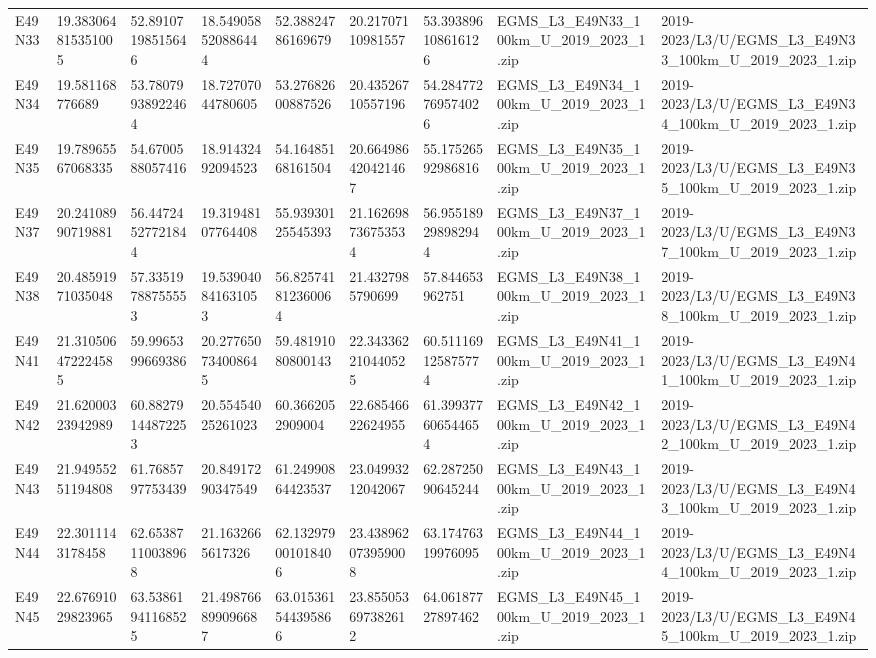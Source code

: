 \begin{landscape}
\begin{longtable}{lllllllll}
E49N33 & 19.383064815351005 & 52.89107198515646 & 18.549058520886444 & 52.38824786169679 & 20.21707110981557 & 53.393896108616126 & EGMS\_L3\_E49N33\_100km\_U\_2019\_2023\_1.zip & 2019-2023/L3/U/EGMS\_L3\_E49N33\_100km\_U\_2019\_2023\_1.zip \\
E49N34 & 19.581168776689 & 53.78079938922464 & 18.72707044780605 & 53.27682600887526 & 20.43526710557196 & 54.284772769574026 & EGMS\_L3\_E49N34\_100km\_U\_2019\_2023\_1.zip & 2019-2023/L3/U/EGMS\_L3\_E49N34\_100km\_U\_2019\_2023\_1.zip \\
E49N35 & 19.78965567068335 & 54.6700588057416 & 18.91432492094523 & 54.16485168161504 & 20.664986420421467 & 55.17526592986816 & EGMS\_L3\_E49N35\_100km\_U\_2019\_2023\_1.zip & 2019-2023/L3/U/EGMS\_L3\_E49N35\_100km\_U\_2019\_2023\_1.zip \\
E49N37 & 20.24108990719881 & 56.44724527721844 & 19.31948107764408 & 55.93930125545393 & 21.162698736753534 & 56.955189298982944 & EGMS\_L3\_E49N37\_100km\_U\_2019\_2023\_1.zip & 2019-2023/L3/U/EGMS\_L3\_E49N37\_100km\_U\_2019\_2023\_1.zip \\
E49N38 & 20.48591971035048 & 57.33519788755553 & 19.539040841631053 & 56.825741812360064 & 21.4327985790699 & 57.844653962751 & EGMS\_L3\_E49N38\_100km\_U\_2019\_2023\_1.zip & 2019-2023/L3/U/EGMS\_L3\_E49N38\_100km\_U\_2019\_2023\_1.zip \\
E49N41 & 21.310506472224585 & 59.9965399669386 & 20.277650734008645 & 59.48191080800143 & 22.343362210440525 & 60.511169125875774 & EGMS\_L3\_E49N41\_100km\_U\_2019\_2023\_1.zip & 2019-2023/L3/U/EGMS\_L3\_E49N41\_100km\_U\_2019\_2023\_1.zip \\
E49N42 & 21.62000323942989 & 60.88279144872253 & 20.55454025261023 & 60.3662052909004 & 22.68546622624955 & 61.399377606544654 & EGMS\_L3\_E49N42\_100km\_U\_2019\_2023\_1.zip & 2019-2023/L3/U/EGMS\_L3\_E49N42\_100km\_U\_2019\_2023\_1.zip \\
E49N43 & 21.94955251194808 & 61.7685797753439 & 20.84917290347549 & 61.24990864423537 & 23.04993212042067 & 62.28725090645244 & EGMS\_L3\_E49N43\_100km\_U\_2019\_2023\_1.zip & 2019-2023/L3/U/EGMS\_L3\_E49N43\_100km\_U\_2019\_2023\_1.zip \\
E49N44 & 22.3011143178458 & 62.65387110038968 & 21.1632665617326 & 62.132979001018406 & 23.438962073959008 & 63.17476319976095 & EGMS\_L3\_E49N44\_100km\_U\_2019\_2023\_1.zip & 2019-2023/L3/U/EGMS\_L3\_E49N44\_100km\_U\_2019\_2023\_1.zip \\
E49N45 & 22.67691029823965 & 63.53861941168525 & 21.498766899096687 & 63.015361544395866 & 23.855053697382612 & 64.06187727897462 & EGMS\_L3\_E49N45\_100km\_U\_2019\_2023\_1.zip & 2019-2023/L3/U/EGMS\_L3\_E49N45\_100km\_U\_2019\_2023\_1.zip \\

\end{longtable}
\end{landscape}
